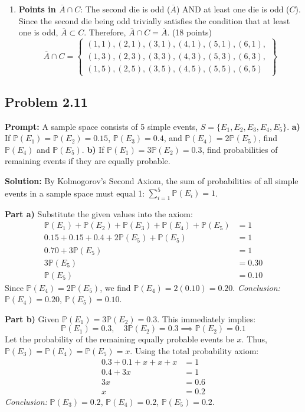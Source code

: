 \documentclass[11pt, letterpaper]{article}
\theoremstyle{definition}
\theoremstyle{remark}
\newcommand{\Prob}{\mathbb{P}}
\newcommand{\comp}[1]{\overline{#1}}
\begin{document}
\begin{enumerate}[label=\arabic*.]
    \item \textbf{Points in $\comp{A} \cap C$}: The second die is odd ($\comp{A}$) AND at least one die is odd ($C$). Since the second die being odd trivially satisfies the condition that at least one is odd, $\comp{A} \subset C$. Therefore, $\comp{A} \cap C = \comp{A}$. (18 points)
    \[ \comp{A} \cap C = \left\{ \begin{array}{l} (1,1), (2,1), (3,1), (4,1), (5,1), (6,1), \\ (1,3), (2,3), (3,3), (4,3), (5,3), (6,3), \\ (1,5), (2,5), (3,5), (4,5), (5,5), (6,5) \end{array} \right\} \]
\end{enumerate}

\subsection*{Problem 2.11}
\textbf{Prompt:} A sample space consists of 5 simple events, $S = \{E_{1}, E_{2}, E_{3}, E_{4}, E_{5}\}$. 
\textbf{a)} If $\Prob(E_{1}) = \Prob(E_{2}) = 0.15$, $\Prob(E_{3}) = 0.4$, and $\Prob(E_{4}) = 2\Prob(E_{5})$, find $\Prob(E_{4})$ and $\Prob(E_{5})$.
\textbf{b)} If $\Prob(E_{1}) = 3\Prob(E_{2}) = 0.3$, find probabilities of remaining events if they are equally probable.

\textbf{Solution:}
By Kolmogorov's Second Axiom, the sum of probabilities of all simple events in a sample space must equal 1: $\sum_{i=1}^{5} \Prob(E_{i}) = 1$.

\textbf{Part a)}
Substitute the given values into the axiom:
\begin{align*}
\Prob(E_{1}) + \Prob(E_{2}) + \Prob(E_{3}) + \Prob(E_{4}) + \Prob(E_{5}) &= 1 \\
0.15 + 0.15 + 0.4 + 2\Prob(E_{5}) + \Prob(E_{5}) &= 1 \\
0.70 + 3\Prob(E_{5}) &= 1 \\
3\Prob(E_{5}) &= 0.30 \\
\Prob(E_{5}) &= 0.10
\end{align*}
Since $\Prob(E_{4}) = 2\Prob(E_{5})$, we find $\Prob(E_{4}) = 2(0.10) = 0.20$.
\textit{Conclusion:} $\Prob(E_{4}) = 0.20$, $\Prob(E_{5}) = 0.10$.

\textbf{Part b)}
Given $\Prob(E_{1}) = 3\Prob(E_{2}) = 0.3$. This immediately implies:
\[ \Prob(E_{1}) = 0.3, \quad 3\Prob(E_{2}) = 0.3 \implies \Prob(E_{2}) = 0.1 \]
Let the probability of the remaining equally probable events be $x$. Thus, $\Prob(E_{3}) = \Prob(E_{4}) = \Prob(E_{5}) = x$. Using the total probability axiom:
\begin{align*}
0.3 + 0.1 + x + x + x &= 1 \\
0.4 + 3x &= 1 \\
3x &= 0.6 \\
x &= 0.2
\end{align*}
\textit{Conclusion:} $\Prob(E_{3}) = 0.2$, $\Prob(E_{4}) = 0.2$, $\Prob(E_{5}) = 0.2$.
\end{document}
